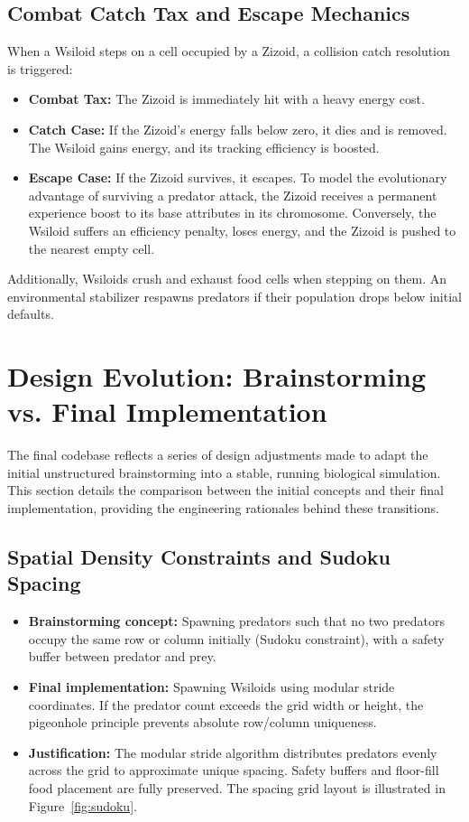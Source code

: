 \documentclass[11pt,a4paper]{article}
\begin{document}
\subsection{Combat Catch Tax and Escape Mechanics}
When a Wsiloid steps on a cell occupied by a Zizoid, a collision catch resolution is triggered:
\begin{itemize}
    \item \textbf{Combat Tax:} The Zizoid is immediately hit with a heavy energy cost.
    \item \textbf{Catch Case:} If the Zizoid's energy falls below zero, it dies and is removed. The Wsiloid gains energy, and its tracking efficiency is boosted.
    \item \textbf{Escape Case:} If the Zizoid survives, it escapes. To model the evolutionary advantage of surviving a predator attack, the Zizoid receives a permanent experience boost to its base attributes in its chromosome. Conversely, the Wsiloid suffers an efficiency penalty, loses energy, and the Zizoid is pushed to the nearest empty cell.
\end{itemize}
Additionally, Wsiloids crush and exhaust food cells when stepping on them. An environmental stabilizer respawns predators if their population drops below initial defaults.

\section{Design Evolution: Brainstorming vs. Final Implementation}

The final codebase reflects a series of design adjustments made to adapt the initial unstructured brainstorming into a stable, running biological simulation. This section details the comparison between the initial concepts and their final implementation, providing the engineering rationales behind these transitions.

\subsection{Spatial Density Constraints and Sudoku Spacing}
\begin{itemize}
    \item \textbf{Brainstorming concept:} Spawning predators such that no two predators occupy the same row or column initially (Sudoku constraint), with a safety buffer between predator and prey.
    \item \textbf{Final implementation:} Spawning Wsiloids using modular stride coordinates. If the predator count exceeds the grid width or height, the pigeonhole principle prevents absolute row/column uniqueness.
    \item \textbf{Justification:} The modular stride algorithm distributes predators evenly across the grid to approximate unique spacing. Safety buffers and floor-fill food placement are fully preserved. The spacing grid layout is illustrated in Figure~\ref{fig:sudoku}.
\end{itemize}
\end{document}
